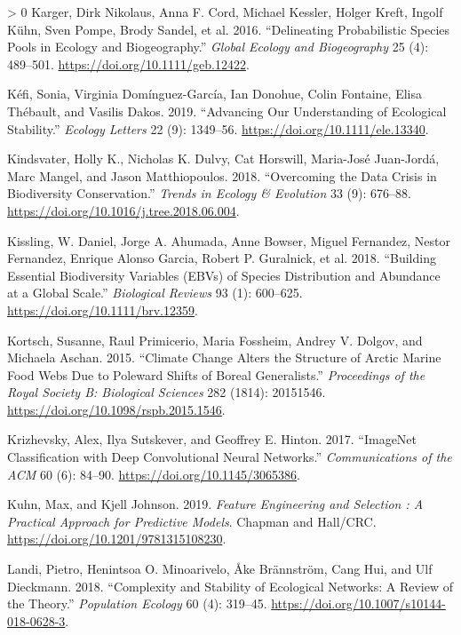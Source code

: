 \documentclass[10pt,oneside]{article}
\newlength{\cslhangindent}
\newenvironment{CSLReferences}[3] %
 {%
  \setlength{\parindent}{0pt}
  \ifodd #1 \everypar{\setlength{\hangindent}{\cslhangindent}}\ignorespaces\fi
  \ifnum #2 > 0
  \setlength{\parskip}{#2\baselineskip}
  \fi
 }%
 {}
\begin{document}
\begin{CSLReferences}{1}{0}
\leavevmode\hypertarget{ref-Karger2016DelPro}{}%
Karger, Dirk Nikolaus, Anna F. Cord, Michael Kessler, Holger Kreft,
Ingolf Kühn, Sven Pompe, Brody Sandel, et al. 2016. {``Delineating
Probabilistic Species Pools in Ecology and Biogeography.''} \emph{Global
Ecology and Biogeography} 25 (4): 489--501.
\url{https://doi.org/10.1111/geb.12422}.

\leavevmode\hypertarget{ref-Kefi2019AdvOur}{}%
Kéfi, Sonia, Virginia Domínguez-García, Ian Donohue, Colin Fontaine,
Elisa Thébault, and Vasilis Dakos. 2019. {``Advancing Our Understanding
of Ecological Stability.''} \emph{Ecology Letters} 22 (9): 1349--56.
\url{https://doi.org/10.1111/ele.13340}.

\leavevmode\hypertarget{ref-Kindsvater2018OveDat}{}%
Kindsvater, Holly K., Nicholas K. Dulvy, Cat Horswill, Maria-José
Juan-Jordá, Marc Mangel, and Jason Matthiopoulos. 2018. {``Overcoming
the Data Crisis in Biodiversity Conservation.''} \emph{Trends in Ecology
\& Evolution} 33 (9): 676--88.
\url{https://doi.org/10.1016/j.tree.2018.06.004}.

\leavevmode\hypertarget{ref-Kissling2018BuiEss}{}%
Kissling, W. Daniel, Jorge A. Ahumada, Anne Bowser, Miguel Fernandez,
Nestor Fernandez, Enrique Alonso Garcia, Robert P. Guralnick, et al.
2018. {``Building Essential Biodiversity Variables (EBVs) of Species
Distribution and Abundance at a Global Scale.''} \emph{Biological
Reviews} 93 (1): 600--625. \url{https://doi.org/10.1111/brv.12359}.

\leavevmode\hypertarget{ref-Kortsch2015CliCha}{}%
Kortsch, Susanne, Raul Primicerio, Maria Fossheim, Andrey V. Dolgov, and
Michaela Aschan. 2015. {``Climate Change Alters the Structure of Arctic
Marine Food Webs Due to Poleward Shifts of Boreal Generalists.''}
\emph{Proceedings of the Royal Society B: Biological Sciences} 282
(1814): 20151546. \url{https://doi.org/10.1098/rspb.2015.1546}.

\leavevmode\hypertarget{ref-Krizhevsky2017ImaCla}{}%
Krizhevsky, Alex, Ilya Sutskever, and Geoffrey E. Hinton. 2017.
{``ImageNet Classification with Deep Convolutional Neural Networks.''}
\emph{Communications of the ACM} 60 (6): 84--90.
\url{https://doi.org/10.1145/3065386}.

\leavevmode\hypertarget{ref-Kuhn2019FeaEng}{}%
Kuhn, Max, and Kjell Johnson. 2019. \emph{Feature Engineering and
Selection : A Practical Approach for Predictive Models}. Chapman and
Hall/CRC. \url{https://doi.org/10.1201/9781315108230}.

\leavevmode\hypertarget{ref-Landi2018ComSta}{}%
Landi, Pietro, Henintsoa O. Minoarivelo, Åke Brännström, Cang Hui, and
Ulf Dieckmann. 2018. {``Complexity and Stability of Ecological Networks:
A Review of the Theory.''} \emph{Population Ecology} 60 (4): 319--45.
\url{https://doi.org/10.1007/s10144-018-0628-3}.


\end{CSLReferences}
\end{document}
